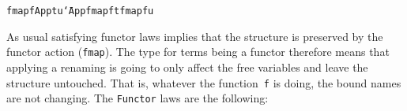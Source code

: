 \documentclass[9pt,authoryear]{sigplanconf}
\begin{document}
{{}\vphantom{$\{$}}\texttt{\mbox{\hspace{0.50em}}}\texttt{\mbox{\hspace{0.50em}}}\texttt{fmap}\texttt{\mbox{\hspace{0.50em}}}\texttt{f}\texttt{\mbox{\hspace{0.50em}}}\texttt{\makebox[1.22ex][l]{$ {(} $}}\texttt{App}\texttt{\mbox{\hspace{0.50em}}}\texttt{t}\texttt{\mbox{\hspace{0.50em}}}\texttt{u}\texttt{\makebox[1.22ex][r]{$ {)} $}}\texttt{\mbox{\hspace{0.50em}}}\texttt{{\char `\=}}\texttt{\mbox{\hspace{0.50em}}}\texttt{App}\texttt{\mbox{\hspace{0.50em}}}\texttt{\makebox[1.22ex][l]{$ {(} $}}\texttt{fmap}\texttt{\mbox{\hspace{0.50em}}}\texttt{f}\texttt{\mbox{\hspace{0.50em}}}\texttt{t}\texttt{\makebox[1.22ex][r]{$ {)} $}}\texttt{\mbox{\hspace{0.50em}}}\texttt{\makebox[1.22ex][l]{$ {(} $}}\texttt{fmap}\texttt{\mbox{\hspace{0.50em}}}\texttt{f}\texttt{\mbox{\hspace{0.50em}}}\texttt{u}\texttt{\makebox[1.22ex][r]{$ {)} $}}\texttt{{\nopagebreak \newline%
}\vphantom{$\{$}}%


%
As usual satisfying functor laws implies that the structure is
    preserved by the functor action (\texttt{fmap}). The type for terms being
    a functor therefore means that applying a renaming is going to only
    affect the free variables and leave the structure untouched. That is,
    whatever the function{~}\texttt{f} is doing, the bound names are not
    changing. The \texttt{Functor} laws are the following{:}%


%
%


{\nopagebreak }
\end{document}
